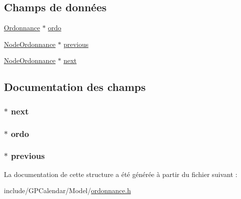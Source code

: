 \subsection*{Champs de données}
\begin{DoxyCompactItemize}
\item 
\hyperlink{struct_ordonnance}{Ordonnance} $\ast$ \hyperlink{struct_node_ordonnance_ad6081216f8df13cefec2383c92776b3e}{ordo}
\item 
\hyperlink{struct_node_ordonnance}{Node\-Ordonnance} $\ast$ \hyperlink{struct_node_ordonnance_a3ea5580d83870a88946801967c6940be}{previous}
\item 
\hyperlink{struct_node_ordonnance}{Node\-Ordonnance} $\ast$ \hyperlink{struct_node_ordonnance_a7b34255519f5fe256a0ad0979680e632}{next}
\end{DoxyCompactItemize}


\subsection{Documentation des champs}
\hypertarget{struct_node_ordonnance_a7b34255519f5fe256a0ad0979680e632}{
\subsubsection[{next}]{$\ast$ next}}\label{struct_node_ordonnance_a7b34255519f5fe256a0ad0979680e632}
\hypertarget{struct_node_ordonnance_ad6081216f8df13cefec2383c92776b3e}{
\subsubsection[{ordo}]{$\ast$ ordo}}\label{struct_node_ordonnance_ad6081216f8df13cefec2383c92776b3e}
\hypertarget{struct_node_ordonnance_a3ea5580d83870a88946801967c6940be}{
\subsubsection[{previous}]{$\ast$ previous}}\label{struct_node_ordonnance_a3ea5580d83870a88946801967c6940be}


La documentation de cette structure a été générée à partir du fichier suivant \-:\begin{DoxyCompactItemize}
\item 
include/\-G\-P\-Calendar/\-Model/\hyperlink{ordonnance_8h}{ordonnance.\-h}\end{DoxyCompactItemize}
